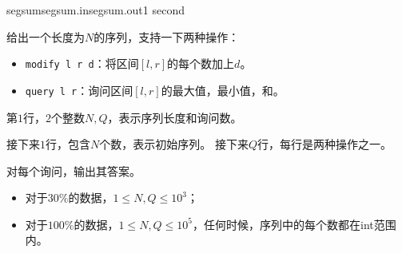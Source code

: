 \documentclass[11pt,a4paper,oneside]{article}
\begin{document}
\begin{problem}{segsum}{segsum.in}{segsum.out}{1 second} 
    
    给出一个长度为$N$的序列，支持一下两种操作：
    \begin{itemize}
    	\item \texttt{modify l r d}：将区间$[l,r]$的每个数加上$d$。
    	\item \texttt{query l r}：询问区间$[l,r]$的最大值，最小值，和。
    \end{itemize}

    \InputFile

    第$1$行，$2$个整数$N, Q$，表示序列长度和询问数。

	接下来$1$行，包含$N$个数，表示初始序列。
    接下来$Q$行，每行是两种操作之一。

    \OutputFile

    对每个询问，输出其答案。

    \Example

    \begin{example}
    \end{example}

    \Note
    
    \begin{itemize}
    	\item 对于$30\%$的数据，$1 \leq N, Q \leq 10^3$；
        \item 对于$100\%$的数据，$1 \leq N, Q \leq 10^5$，任何时候，序列中的每个数都在int范围内。
    \end{itemize}

\end{problem}
\end{document}
